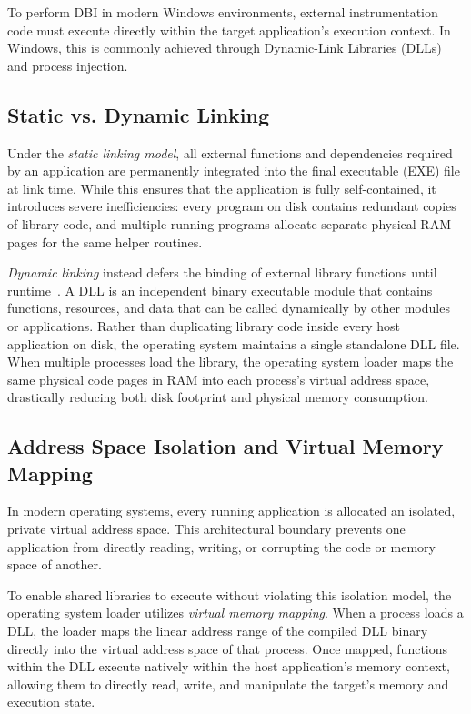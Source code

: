 To perform \ac{DBI} in modern Windows environments, external instrumentation code must execute directly within the target application's execution context. In Windows, this is commonly achieved through Dynamic-Link Libraries (\acp{DLL}) and process injection.

\subsection{Static vs. Dynamic Linking}
Under the \emph{static linking model}, all external functions and dependencies required by an application are permanently integrated into the final executable (EXE) file at link time. While this ensures that the application is fully self-contained, it introduces severe inefficiencies: every program on disk contains redundant copies of library code, and multiple running programs allocate separate physical RAM pages for the same helper routines.

\emph{Dynamic linking} instead defers the binding of external library functions until runtime~\cite[Ch.10]{book:levine2000linkers}. A \ac{DLL} is an independent binary executable module that contains functions, resources, and data that can be called dynamically by other modules or applications. Rather than duplicating library code inside every host application on disk, the operating system maintains a single standalone \ac{DLL} file. When multiple processes load the library, the operating system loader maps the same physical code pages in RAM into each process's virtual address space, drastically reducing both disk footprint and physical memory consumption.


\subsection{Address Space Isolation and Virtual Memory Mapping}
\label{subsec:address_space_isolation}
In modern operating systems, every running application is allocated an isolated, private virtual address space. This architectural boundary prevents one application from directly reading, writing, or corrupting the code or memory space of another.

To enable shared libraries to execute without violating this isolation model, the operating system loader utilizes \emph{virtual memory mapping}. When a process loads a \ac{DLL}, the loader maps the linear address range of the compiled \ac{DLL} binary directly into the virtual address space of that process. Once mapped, functions within the \ac{DLL} execute natively within the host application's memory context, allowing them to directly read, write, and manipulate the target's memory and execution state.

